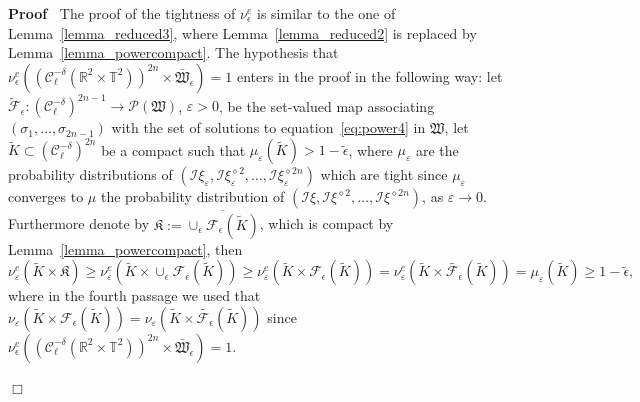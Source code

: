 \documentclass[a4paper,10pt]{article}
\newcommand{\assign}{:=}
\newenvironment{proof}{\noindent\textbf{Proof\ }}{\hspace*{\fill}$\Box$\medskip}
\begin{document}
\begin{proof}
  The proof of the tightness of $\nu_{\epsilon}^e$ is similar to the one of
  Lemma~\ref{lemma_reduced3}, where Lemma~\ref{lemma_reduced2} is replaced by
  Lemma~\ref{lemma_powercompact}. The hypothesis that $\nu^e_{\epsilon}
  ((\mathcal{C}^{- \delta}_{\ell} (\mathbb{R}^2 \times \mathbb{T}^2))^{2 n}
  \times \mathfrak{\bar{W}}_{\epsilon}) = 1$ enters in the proof in the
  following way: let $\widetilde{\mathcal{F}}_{\epsilon} : (\mathcal{C}^{-
  \delta}_{\ell})^{2 n - 1} \rightarrow \mathcal{P} (\mathfrak{W})$,
  $\varepsilon > 0$, be the set-valued map associating $(\sigma_1, \ldots,
  \sigma_{2 n - 1})$ with the set of solutions to equation~{\eqref{eq:power4}}
  in $\mathfrak{W}$, let $\tilde{K} \subset (\mathcal{C}^{- \delta}_{\ell})^{2
  n}$ be a compact such that $\mu_{\varepsilon} (\tilde{K}) > 1 -
  \tilde{\epsilon}$, where $\mu_{\varepsilon}$ are the probability
  distributions of $(\mathcal{I} \xi_{\varepsilon}, \mathcal{I}
  \xi_{\varepsilon}^{\diamond 2}, \ldots, \mathcal{I}
  \xi_{\varepsilon}^{\diamond 2 n})$ which are tight since $\mu_{\varepsilon}$
  converges to $\mu$ the probability distribution of $(\mathcal{I} \xi,
  \mathcal{I} \xi^{\diamond 2}, \ldots, \mathcal{I} \xi^{\diamond 2 n})$, as
  $\varepsilon \rightarrow 0$. Furthermore denote by $\mathfrak{K} \assign
  \overline{\cup_{\epsilon} \mathcal{F}_{\epsilon} (\tilde{K})}$, which is
  compact by Lemma~\ref{lemma_powercompact}, then
  \[ \nu_{\varepsilon}^e (\tilde{K} \times \mathfrak{K}) \geqslant
     \nu_{\varepsilon}^e (\tilde{K} \times \cup_{\epsilon}
     \mathcal{F}_{\epsilon} (\tilde{K})) \geqslant \nu_{\varepsilon}^e
     (\tilde{K} \times \mathcal{F}_{\epsilon} (\tilde{K})) =
     \nu_{\varepsilon}^e (\tilde{K} \times \widetilde{\mathcal{F}_{\epsilon}}
     (\tilde{K})) = \mu_{\varepsilon} (\tilde{K}) \geqslant 1 -
     \tilde{\epsilon}, \]
  where in the fourth passage we used that $\nu_{\varepsilon} (\tilde{K}
  \times \mathcal{F}_{\epsilon} (\tilde{K})) = \nu_{\varepsilon} (\tilde{K}
  \times \widetilde{\mathcal{F}_{\epsilon}} (\tilde{K}))$ since
  $\nu^e_{\epsilon} ((\mathcal{C}^{- \delta}_{\ell} (\mathbb{R}^2 \times
  \mathbb{T}^2))^{2 n} \times \mathfrak{\bar{W}}_{\epsilon}) = 1$.
  

\end{proof}
\end{document}

